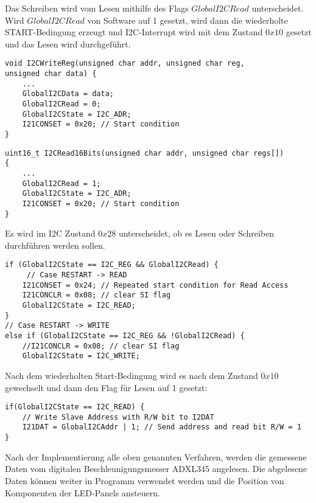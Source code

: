 Das Schreiben wird vom Lesen mithilfe des Flags $GlobalI2CRead$ unterscheidet. Wird $GlobalI2CRead$ von Software auf 1 gesetzt, wird dann die wiederholte START-Bedingung erzeugt und I2C-Interrupt wird mit dem Zustand $0x10$ gesetzt und das Lesen wird durchgeführt. 

\begin{lstlisting}
void I2CWriteReg(unsigned char addr, unsigned char reg, 
unsigned char data) {
	...
	GlobalI2CData = data;
	GlobalI2CRead = 0;
	GlobalI2CState = I2C_ADR;
	I21CONSET = 0x20; // Start condition
}
\end{lstlisting}

\begin{lstlisting}
uint16_t I2CRead16Bits(unsigned char addr, unsigned char regs[])  
{
	...
	GlobalI2CRead = 1;
	GlobalI2CState = I2C_ADR;
	I21CONSET = 0x20; // Start condition
}
\end{lstlisting}

Es wird im I2C Zustand $0x28$ unterscheidet, ob es Lesen oder Schreiben durchführen werden sollen.
\begin{lstlisting}
if (GlobalI2CState == I2C_REG && GlobalI2CRead) {
     // Case RESTART -> READ
	I21CONSET = 0x24; // Repeated start condition for Read Access
	I21CONCLR = 0x08; // clear SI flag
	GlobalI2CState = I2C_READ;
}
// Case RESTART -> WRITE
else if (GlobalI2CState == I2C_REG && !GlobalI2CRead) {
	//I21CONCLR = 0x08; // clear SI flag
	GlobalI2CState = I2C_WRITE;
\end{lstlisting}

Nach dem wiederholten Start-Bedingung wird es nach dem Zustand $0x10$ gewechselt und dann den Flag für Lesen auf 1 gesetzt:
\begin{lstlisting}
if(GlobalI2CState == I2C_READ) {
	// Write Slave Address with R/W bit to I2DAT
	I21DAT = GlobalI2CAddr | 1; // Send address and read bit R/W = 1
}
\end{lstlisting}

Nach der Implementierung alle oben genannten Verfahren, werden die gemessene Daten vom digitalen Beschleunigungsmesser ADXL345 angelesen. Die abgelesene Daten können weiter in Programm verwendet werden und die Position von Komponenten der LED-Panels ansteuern.

